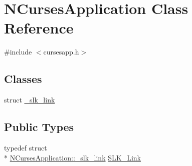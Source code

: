 \hypertarget{class_n_curses_application}{\section{N\-Curses\-Application Class Reference}
\label{class_n_curses_application}
}


{\ttfamily \#include $<$cursesapp.\-h$>$}

\subsection*{Classes}
\begin{DoxyCompactItemize}
\item 
struct \hyperlink{struct_n_curses_application_1_1__slk__link}{\-\_\-slk\-\_\-link}
\end{DoxyCompactItemize}
\subsection*{Public Types}
\begin{DoxyCompactItemize}
\item 
typedef struct \\*
\hyperlink{struct_n_curses_application_1_1__slk__link}{N\-Curses\-Application\-::\-\_\-slk\-\_\-link} \hyperlink{class_n_curses_application_a967e03c00bd923d718a18be735b6104b}{S\-L\-K\-\_\-\-Link}
\end{DoxyCompactItemize}
